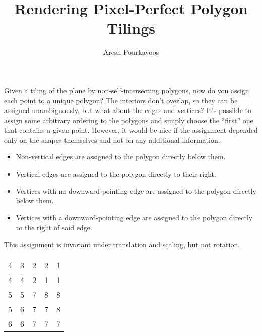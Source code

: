 \documentclass{article}
\begin{document}
\title{Rendering Pixel-Perfect Polygon Tilings}
\author{Aresh Pourkavoos}
\maketitle

Given a tiling of the plane by non-self-intersecting polygons,
now do you assign each point to a unique polygon?
The interiors don't overlap, so they can be assigned unambiguously,
but what about the edges and vertices?
It's possible to assign some arbitrary ordering to the polygons
and simply choose the ``first'' one that contains a given point.
However, it would be nice if the assignment
depended only on the shapes themselves
and not on any additional information.
\begin{itemize}
\item
  Non-vertical edges are assigned to the polygon directly below them.
\item
  Vertical edges are assigned to the polygon directly to their right.
\item
  Vertices with no downward-pointing edge are assigned to the polygon directly below them.
\item
  Vertices with a downward-pointing edge are assigned to the polygon directly to the right of said edge.
\end{itemize}
This assignment is invariant under translation and scaling, but not rotation.
\begin{center}
  \begin{tabular}{|c c c c c|}
    \hline
    4 & 3 & 2 & 2 & 1 \\
    4 & 4 & 2 & 1 & 1 \\
    5 & 5 & 7 & 8 & 8 \\
    5 & 6 & 7 & 7 & 8 \\
    6 & 6 & 7 & 7 & 7 \\ \hline
  \end{tabular}
\end{center}
\end{document}
